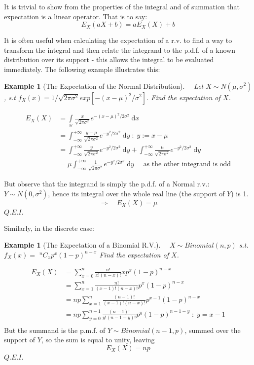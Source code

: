\documentclass[12pt,a4paper]{article}
\newtheorem{ex}[thm]{Example}
\begin{document}
It is trivial to show from the properties of the integral and of summation that expectation is a linear operator. That is to say:
$$E_{X}(aX + b) = aE_{X}(X) + b$$

It is often useful when calculating the expectation of a r.v. to find a way to transform the integral and then relate the integrand to the p.d.f. of a known distribution over its support - this allows the integral to be evaluated immediately. The following example illustrates this:

\begin{ex}[The Expectation of the Normal Distribution]
\vspace{1cm}

$\quad$Let $X \sim N(\mu, \sigma^2)$, s.t $f_X(x) = 1/\sqrt{2 \pi \sigma^2} exp[-(x - \mu)^2/\sigma^2]$. Find the expectation of $X$.
\end{ex}

\begin{align*}
E_{X}(X) &= \int\limits_{\mathbb{R}}\!\! \frac{x}{\sqrt{2 \pi \sigma^2}} e^{-(x - \mu)^2/2\sigma^2}\;\mathrm{d}x\\
&= \int_{-\infty}^{+\infty}\!\!\frac{y + \mu}{\sqrt{2 \pi \sigma^2}}e^{-y^2/2\sigma^2}\;\mathrm{d}y \; : \; y := x - \mu \\
&= \int_{-\infty}^{+\infty}\!\! \frac{y}{\sqrt{2 \pi \sigma^2}}e^{-y^2/2\sigma^2}\;\mathrm{d}y + \int_{-\infty}^{+\infty} \!\!\frac{\mu}{\sqrt{2 \pi \sigma^2}}e^{-y^2/2\sigma^2}\;\mathrm{d}y \\
&= \mu \int_{-\infty}^{+\infty} \!\!\frac{1}{\sqrt{2 \pi \sigma^2}}e^{-y^2/2\sigma^2}\;\mathrm{d}y\quad \text{ as the other integrand is odd}
\end{align*}

But observe that the integrand is simply the p.d.f. of a Normal r.v.: $Y \sim N(0,\sigma^2)$, hence its integral over the whole real line (the support of $Y$) is 1.
$$\Rightarrow \quad E_{X}(X) = \mu$$
\hfill $Q.E.I.$

\noindent Similarly, in the discrete case:

\begin{ex}[The Expectation of a Binomial R.V.]
\vspace{1cm}

$\quad X \sim Binomial(n, p)$ s.t.$f_X(x) =$ $^nC_x p^x (1 - p)^{n - x}$ Find the expectation of $X$.
\end{ex}

\begin{align*}
E_{X}(X) &= \sum_{x = 0}^n \frac{n!}{x! (n - x)!} x p^x (1 - p)^{n - x}\\
&= \sum_{x = 1}^n \frac{n!}{(x - 1)! (n - x)!} p^x (1 - p)^{n - x}\\
&= np \sum_{x = 1}^n \frac{(n - 1)!}{(x - 1)! (n - x)!}p^{x - 1} (1 - p)^{n - x}\\
&= np \sum_{y = 0}^{n - 1} \frac{(n - 1)!}{y! (n - 1 - y)!} p^y (1 - p)^{n - 1 - y} \; : \; y = x - 1\\
\end{align*}
But the summand is the p.m.f. of $Y \sim Binomial(n - 1, p)$, summed over the support of $Y$, so the sum is equal to unity, leaving
$$E_{X}(X) = np$$
\hfill $Q.E.I.$
\end{document}
